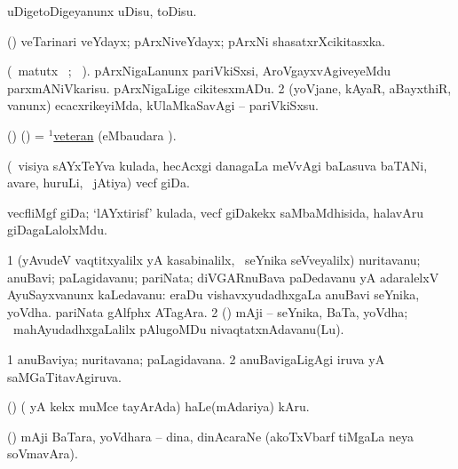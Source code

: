 \bentry
{} 
\gl{\sakirx}
\expl{}
\bmng
 uDigetoDigeyanunx uDisu, toDisu. 
\emng
\eentry

\bentry
{} 
\gl{\nA}
\expl{}
\bmng
 (\AmA) veTarinari veYdayx; pArxNiveYdayx; pArxNi shasatxrXcikitasxka. 
\emng
\eentry

\bentry
{} 
\gl{\sakirx}(\BU\ matutx \BUkaq\ ; \vakaq\
). \bmng
\bnum
{} 
\banum
{} pArxNigaLanunx pariVkiSxsi, AroVgayxvAgiveyeMdu parxmANiVkarisu. 
\alnum{b} pArxNigaLige cikitesxmADu. 
\eanum
\numie
\num{2} (yoVjane, kAyaR, aBayxthiR, \mo vanunx) ecacxrikeyiMda, kUlaMkaSavAgi -- pariVkiSxsu. 
\enum
\emng
\eentry

\bentry
{} 
\gl{\nA}
\expl{}
\bmng
 (\ame) (\AmA) = \hyperlink{veteran(1)}{$^1$veteran} (eMbaudara \saMkiSx). 
\emng
\eentry

\bentry
{} 
\gl{\nA}
\expl{}
\bmng
 (\kanmu\ visiya sAYxTeYva kulada, hecAcxgi danagaLa meVvAgi baLasuva baTANi, avare, huruLi, \mo\ jAtiya) vecf giDa. 
\emng
\eentry

\bentry
{} 
\gl{\nA}
\expl{}
\bmng
 vecfliMgf giDa; `lAYxtirisf' kulada, vecf giDakekx saMbaMdhisida, halavAru giDagaLalolxMdu. 
\emng
\eentry

\bentry
{} 
\gl{\nA}
\expl{}
\bmng
\bnum
\num{1} (yAvudeV vaqtitxyalilx yA kasabinalilx, \kanmu\ seYnika seVveyalilx) nuritavanu; anuBavi; paLagidavanu; pariNata; diVGARnuBava paDedavanu yA adaralelxV AyuSayxvanunx kaLedavanu:  eraDu vishavxyudadhxgaLa anuBavi seYnika, yoVdha.  pariNata gAlfphx ATagAra. 
\num{2} (\ame) mAji -- seYnika, BaTa, yoVdha; \kanmu\ mahAyudadhxgaLalilx pAlugoMDu nivaqtatxnAdavanu(Lu). 
\enum
\emng
\eentry

\bentry
{} 
\gl{\gu}
\expl{}
\bmng
\bnum
\num{1} anuBaviya; nuritavana; paLagidavana. 
\num{2} anuBavigaLigAgi iruva yA saMGaTitavAgiruva. 
\enum
\emng
\eentry

\bentry
{}
\gl{\nA}
\expl{}
\bmng
 (\birx) ( yA kekx muMce tayArAda) haLe(mAdariya) kAru. 
\emng
\eentry

\bentry
{}
\gl{\nA}
\expl{}
\bmng
 (\ame) mAji BaTara, yoVdhara -- dina, dinAcaraNe (akoTxVbarf tiMgaLa neya soVmavAra). 
\emng
\eentry

